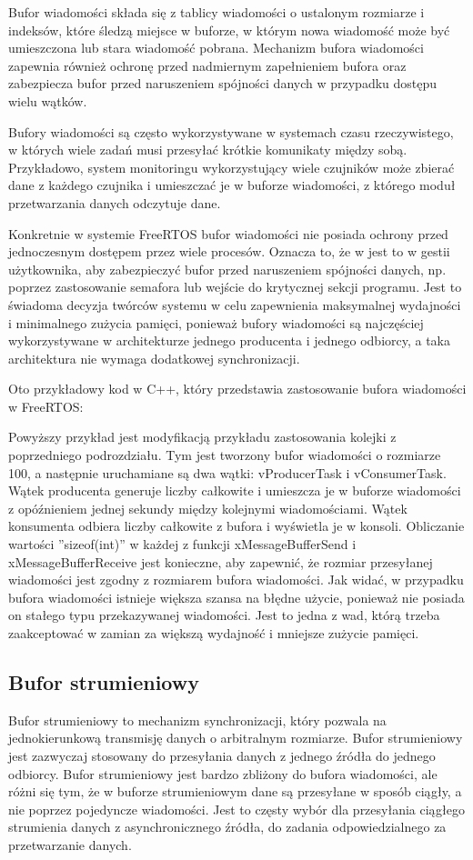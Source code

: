 Bufor wiadomości składa się z tablicy wiadomości o ustalonym rozmiarze i indeksów, które śledzą miejsce w buforze,
w którym nowa wiadomość może być umieszczona lub stara wiadomość pobrana. Mechanizm bufora wiadomości zapewnia również
ochronę przed nadmiernym zapełnieniem bufora oraz zabezpiecza bufor przed naruszeniem spójności danych w przypadku dostępu wielu wątków.

Bufory wiadomości są często wykorzystywane w systemach czasu rzeczywistego, w których wiele zadań musi przesyłać
krótkie komunikaty między sobą. Przykładowo, system monitoringu wykorzystujący wiele czujników może zbierać dane
z każdego czujnika i umieszczać je w buforze wiadomości, z którego moduł przetwarzania danych odczytuje dane.

Konkretnie w systemie FreeRTOS bufor wiadomości nie posiada ochrony przed jednoczesnym dostępem przez wiele procesów. Oznacza to, że w jest
to w gestii użytkownika, aby zabezpieczyć bufor przed naruszeniem spójności danych, np. poprzez zastosowanie semafora lub wejście do krytycznej sekcji
programu. Jest to świadoma decyzja twórców systemu w celu zapewnienia maksymalnej wydajności i minimalnego zużycia pamięci, ponieważ
bufory wiadomości są najczęściej wykorzystywane w architekturze jednego producenta i jednego odbiorcy, a taka architektura nie wymaga dodatkowej
synchronizacji.

Oto przykładowy kod w C++, który przedstawia zastosowanie bufora wiadomości w FreeRTOS:

Powyższy przykład jest modyfikacją przykładu zastosowania kolejki z poprzedniego podrozdziału.
Tym jest tworzony bufor wiadomości o rozmiarze 100, a następnie uruchamiane są dwa wątki: vProducerTask i vConsumerTask.
Wątek producenta generuje liczby całkowite i umieszcza je w buforze wiadomości z opóźnieniem jednej sekundy między kolejnymi wiadomościami.
Wątek konsumenta odbiera liczby całkowite z bufora i wyświetla je w konsoli. Obliczanie wartości ''sizeof(int)'' w każdej z funkcji xMessageBufferSend
i xMessageBufferReceive jest konieczne, aby zapewnić, że rozmiar przesyłanej wiadomości jest zgodny z rozmiarem bufora wiadomości.
Jak widać, w przypadku bufora wiadomości istnieje większa szansa na błędne użycie, ponieważ nie posiada on stałego typu przekazywanej wiadomości.
Jest to jedna z wad, którą trzeba zaakceptować w zamian za większą wydajność i mniejsze zużycie pamięci.

\subsection{Bufor strumieniowy}
Bufor strumieniowy to mechanizm synchronizacji, który pozwala na jednokierunkową transmisję danych o arbitralnym rozmiarze.
Bufor strumieniowy jest zazwyczaj stosowany do przesyłania danych z jednego źródła do jednego odbiorcy. Bufor strumieniowy
jest bardzo zbliżony do bufora wiadomości, ale różni się tym, że w buforze strumieniowym dane są przesyłane w sposób ciągły,
a nie poprzez pojedyncze wiadomości. Jest to częsty wybór dla przesyłania ciągłego strumienia danych z asynchronicznego źródła,
do zadania odpowiedzialnego za przetwarzanie danych.

